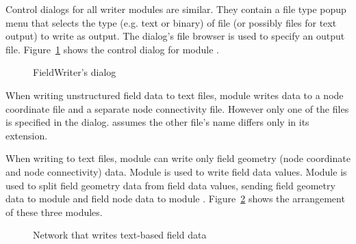 Control dialogs for all writer modules are similar.  They contain a file
type popup menu that selects the type (e.g. text or binary) of file
(or possibly files for text output) to write as output.  The dialog's
file browser is used to specify an output file.  Figure~\ref{fig:FieldWriterGUI}
shows the control dialog for module .  

\begin{figure}[htb]
  \centering
  \begin{makeimage} \end{makeimage}
  \FieldWriterGUI
  \caption{\label{fig:FieldWriterGUI} FieldWriter's dialog}
\end{figure}

When writing unstructured field data to text files, module 
writes data to a node coordinate file and a separate node connectivity
file.  However only one of the files is specified in the dialog.
 assumes the other file's name differs only in its
extension.

When writing to text files, module  can write only
field geometry (node coordinate and node connectivity) data.  Module
 is used to write field data values.  Module
 is used to split field geometry data from
field data values, sending field geometry data to module
 and field node data to module
.  Figure~\ref{fig:WriteFieldNet} shows the
arrangement of these three modules.

\begin{figure}[htb]
  \centering
  \begin{makeimage} \end{makeimage}
  \WriteFieldNet
  \caption{\label{fig:WriteFieldNet} Network that writes text-based field data}
\end{figure}



